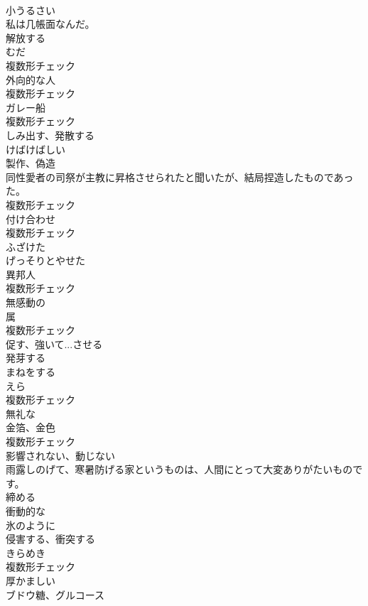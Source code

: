 \documentclass[8pt]{extreport}
\begin{document}
\begin{CJK}{UTF8}{min}
\\	[形容詞]	小うるさい	
\\	私は几帳面なんだ。	
\\	[動詞]	解放する	
\\	[名詞]	むだ	
\\	複数形チェック
\\	[名詞]	外向的な人	
\\	複数形チェック
\\	[名詞]	ガレー船	
\\	複数形チェック
\\	[動詞]	しみ出す、発散する	
\\	[形容詞]	けばけばしい	
\\	[名詞]	製作、偽造	
\\	同性愛者の司祭が主教に昇格させられたと聞いたが、結局捏造したものであった。	
\\	複数形チェック
\\	[名詞]	付け合わせ	
\\	複数形チェック
\\	[形容詞]	ふざけた	
\\	[形容詞]	げっそりとやせた	
\\	[名詞]	異邦人	
\\	複数形チェック
\\	[形容詞]	無感動の	
\\	[名詞]	属	
\\	複数形チェック
\\	[動詞]	促す、強いて...させる	
\\	[動詞]	発芽する	
\\	[動詞]	まねをする	
\\	[名詞]	えら	
\\	複数形チェック
\\	[形容詞]	無礼な	
\\	[名詞]	金箔、金色	
\\	複数形チェック
\\	[形容詞]	影響されない、動じない	
\\	雨露しのげて、寒暑防げる家というものは、人間にとって大変ありがたいものです。	
\\	[動詞]	締める	
\\	[形容詞]	衝動的な	
\\	[形容詞]	氷のように	
\\	[動詞]	侵害する、衝突する	
\\	[名詞]	きらめき	
\\	複数形チェック
\\	[形容詞]	厚かましい	
\\	[名詞]	ブドウ糖、グルコース	

\end{CJK}
\end{document}
